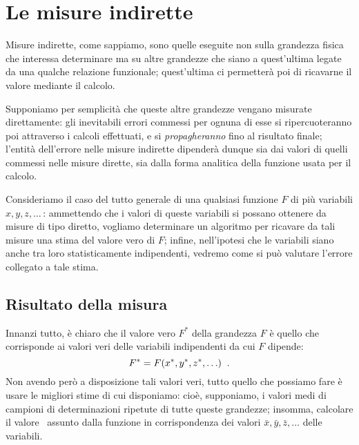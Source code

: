 
\chapter{Le misure indirette}%
%
\label{ch:10.misind}
Misure indirette, come sappiamo, sono quelle eseguite non
sulla grandezza fisica che interessa determinare ma su altre
grandezze che siano a quest'ultima legate da una qualche
relazione funzionale; quest'ultima ci permetter\`a poi di
ricavarne il valore mediante il calcolo.

Supponiamo per semplicit\`a che queste altre grandezze
vengano misurate direttamente: gli inevitabili errori
commessi per ognuna di esse si ripercuoteranno poi
attraverso i calcoli effettuati, e si \emph{propagheranno}
fino al risultato finale; l'entit\`a dell'errore nelle
misure indirette dipender\`a dunque sia dai valori di quelli
commessi nelle misure dirette, sia dalla forma analitica
della funzione usata per il calcolo.

Consideriamo il caso del tutto generale di una qualsiasi
funzione $F$ di pi\`u variabili $ x, y, z, \ldots\, $:
ammettendo che i valori di queste variabili si possano
ottenere da misure di tipo diretto, vogliamo determinare un
algoritmo per ricavare da tali misure una stima del valore
vero di $F$; infine, nell'ipotesi che le variabili siano
anche tra loro statisticamente indipendenti, vedremo come si
pu\`o valutare l'errore collegato a tale stima.

\section{Risultato della misura}
Innanzi tutto, \`e chiaro che il valore vero $F^*$ della
grandezza $F$ \`e quello che corrisponde ai valori veri
delle variabili indipendenti da cui $F$ dipende:
\begin{equation} \label{eq:10.rimind}
  F^* = F( x^*, y^*, z^*,\ldots) \peq .
\end{equation}
Non avendo per\`o a disposizione tali valori veri, tutto
quello che possiamo fare \`e usare le migliori stime di cui
disponiamo: cio\`e, supponiamo, i valori medi di campioni di
determinazioni ripetute di tutte queste grandezze; insomma,
calcolare il valore \ assunto dalla funzione in
corrispondenza dei valori $\bar x, \bar y, \bar z,\ldots$
delle variabili.


